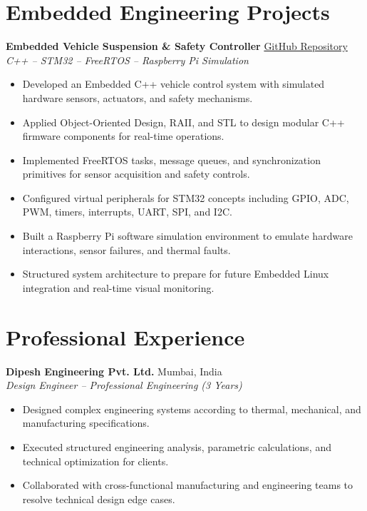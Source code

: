 \documentclass[10pt, a4paper]{article}
\begin{document}
\section{Embedded Engineering Projects}
\textbf{Embedded Vehicle Suspension \& Safety Controller} \hfill \href{https://github.com/ashu304-ops/project1}{GitHub Repository} \\
\textit{C++ -- STM32 -- FreeRTOS -- Raspberry Pi Simulation}
\begin{itemize}
    \item Developed an Embedded C++ vehicle control system with simulated hardware sensors, actuators, and safety mechanisms.
    \item Applied Object-Oriented Design, RAII, and STL to design modular C++ firmware components for real-time operations.
    \item Implemented FreeRTOS tasks, message queues, and synchronization primitives for sensor acquisition and safety controls.
    \item Configured virtual peripherals for STM32 concepts including GPIO, ADC, PWM, timers, interrupts, UART, SPI, and I2C.
    \item Built a Raspberry Pi software simulation environment to emulate hardware interactions, sensor failures, and thermal faults.
    \item Structured system architecture to prepare for future Embedded Linux integration and real-time visual monitoring.
\end{itemize}

\section{Professional Experience}
\textbf{Dipesh Engineering Pvt. Ltd.} \hfill Mumbai, India \\
\textit{Design Engineer -- Professional Engineering (3 Years)}
\begin{itemize}
    \item Designed complex engineering systems according to thermal, mechanical, and manufacturing specifications.
    \item Executed structured engineering analysis, parametric calculations, and technical optimization for clients.
    \item Collaborated with cross-functional manufacturing and engineering teams to resolve technical design edge cases.
\end{itemize}
\end{document}
